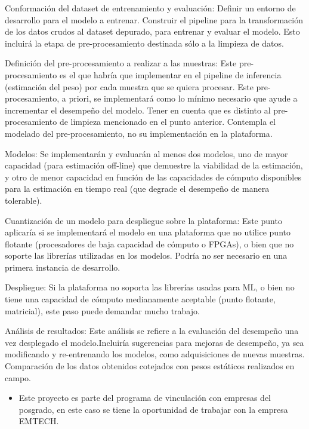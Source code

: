 \documentclass[
11pt, %
codirector, %
]{charter}
\begin{document}
Conformación del dataset de entrenamiento y evaluación:
Definir un entorno de desarrollo para el modelo a entrenar. Construir el pipeline para la transformación de los datos crudos al dataset depurado, para entrenar y evaluar el modelo. Esto incluirá la etapa de pre-procesamiento destinada sólo a la limpieza de datos.

Definición del pre-procesamiento a realizar a las muestras:
Este pre-procesamiento es el que habría que implementar en el pipeline de inferencia (estimación del peso) por cada muestra que se quiera procesar. Este pre-procesamiento, a priori, se implementará como lo mínimo necesario que ayude a incrementar el desempeño del modelo. Tener en cuenta que es distinto al pre-procesamiento de limpieza mencionado en el punto anterior.
Contempla el modelado del pre-procesamiento, no su implementación en la
plataforma.

Modelos:
Se implementarán y evaluarán al menos dos modelos, uno de mayor capacidad (para estimación off-line) que demuestre la viabilidad de la estimación, y otro de menor capacidad en función de las capacidades de cómputo disponibles para la estimación en tiempo real (que degrade el desempeño de manera tolerable).

Cuantización de un modelo para despliegue sobre la plataforma:
Este punto aplicaría si se implementará el modelo en una plataforma que no utilice punto flotante (procesadores de baja capacidad de cómputo o FPGAs), o bien que no soporte las librerías utilizadas en los modelos. Podría no ser necesario en una primera instancia de desarrollo.

Despliegue:
Si la plataforma no soporta las librerías usadas para ML, o bien no tiene una capacidad de cómputo medianamente aceptable (punto flotante, matricial), este paso puede demandar mucho trabajo.

Análisis de resultados:
Este análisis se refiere a la evaluación del desempeño una vez desplegado el modelo.Incluiría sugerencias para mejoras de desempeño, ya sea modificando y re-entrenando los modelos, como adquisiciones de nuevas muestras. Comparación de los datos obtenidos cotejados con pesos estáticos realizados en campo.


\begin{itemize}
	\item Este proyecto es parte del programa de vinculación con empresas del posgrado, en este caso se tiene la oportunidad de trabajar con la empresa EMTECH.
	
\end{itemize}
\end{document}
